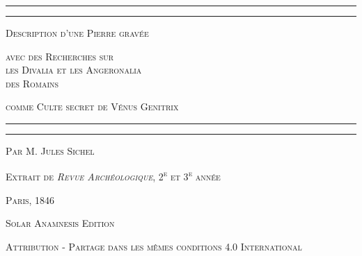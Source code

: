 \documentclass[a4paper, 11pt, oneside, polutonikogreek, french]{article}
\begin{document}
\bfseries
\renewcommand\thefootnote{\bfseries{\arabic{footnote}}}
\let\oldfootnote\footnote
    \renewcommand{\footnote}[1]{\oldfootnote{\bfseries#1}}
\begin{titlepage} %
	\centering %

	
	\rule{\textwidth}{1.6pt}\vspace*{-\baselineskip}\vspace*{2pt} %
	\rule{\textwidth}{0.4pt} %
	
	{\scshape\small Description d'une Pierre gravée}
	
	{\scshape\normalsize avec des Recherches sur \\\LARGE les Divalia et les Angeronalia \\\LARGE des Romains}
	
	{\scshape\small comme Culte secret de Vénus Genitrix}
	
	\rule{\textwidth}{0.4pt}\vspace*{-\baselineskip}\vspace{3.2pt} %
	\rule{\textwidth}{1.6pt} %

	

	\vspace{1\baselineskip}
	
	{\scshape Par \Large M. Jules Sichel} %
	
    
	
	
    \vspace*{\fill}

	\vspace{1\baselineskip}

	{\small\scshape Extrait de \emph{Revue Archéologique}, 2\textsuperscript{e} et 3\textsuperscript{e} année}
	
	{\small\scshape{Paris, 1846}}
	
	\vspace{0.5\baselineskip} %

    \scshape Solar Anamnesis Edition  %
	
	{\scshape\small Attribution - Partage dans les mêmes conditions 4.0 International} %
\end{titlepage}
\setlength{\parskip}{1mm plus1mm minus1mm}
\setcounter{tocdepth}{3}
\setcounter{secnumdepth}{3}
\large
\tableofcontents
\clearpage
\listoffigures
\clearpage
\end{document}

